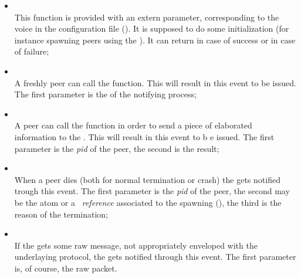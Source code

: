         \begin{itemize}
        \item {} \\
            This function is provided with an extern parameter,
            corresponding to the  voice in the
            configuration file ().
            It is supposed to do some initialization (for instance
            spawning peers using the ).
            It can return  in case of success or
             in case of failure;

        \item {} \\
            A freshly peer can call the 
            function. This will result in this event to be issued. The
            first parameter is the  of the notifying process;

        \item {} \\
            A peer can call the 
            function in order to send a piece of elaborated information to
            the . This will result in this event to b e
            issued. The first parameter is the \emph{pid} of the
            peer, the second is the result;

        \item {} \\
            When a peer dies (both for normal termination or crash) the
             gets notified trough this event. The first
            parameter is the \emph{pid} of the peer, the second may be the
             atom or a \emph{\Erlang\ reference}
            associated to the spawning (), the
            third is the reason of the termination;

        \item {} \\
            If the  gets some raw message, not
            appropriately enveloped with the underlaying protocol, the
             gets notified through this event. The first
            parameter is, of course, the raw packet.

        \end{itemize}

